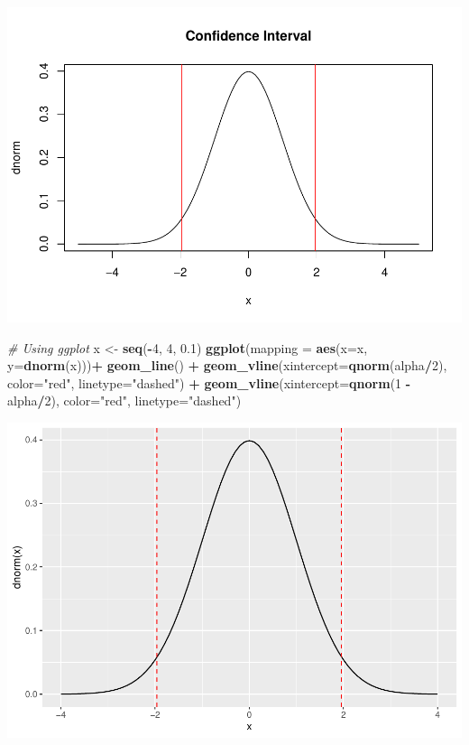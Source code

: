 \documentclass[
]{article}
\newenvironment{Shaded}{\begin{snugshade}}{\end{snugshade}}
\newcommand{\AttributeTok}[1]{\textcolor[rgb]{0.13,0.29,0.53}{#1}}
\newcommand{\CommentTok}[1]{\textcolor[rgb]{0.56,0.35,0.01}{\textit{#1}}}
\newcommand{\DecValTok}[1]{\textcolor[rgb]{0.00,0.00,0.81}{#1}}
\newcommand{\FloatTok}[1]{\textcolor[rgb]{0.00,0.00,0.81}{#1}}
\newcommand{\FunctionTok}[1]{\textcolor[rgb]{0.13,0.29,0.53}{\textbf{#1}}}
\newcommand{\NormalTok}[1]{#1}
\newcommand{\OtherTok}[1]{\textcolor[rgb]{0.56,0.35,0.01}{#1}}
\newcommand{\SpecialCharTok}[1]{\textcolor[rgb]{0.81,0.36,0.00}{\textbf{#1}}}
\newcommand{\StringTok}[1]{\textcolor[rgb]{0.31,0.60,0.02}{#1}}
\begin{document}
\includegraphics{Estimation-and-Confidence-intervals_files/figure-latex/unnamed-chunk-8-1.pdf}

\begin{Shaded}
\begin{Highlighting}[]
\CommentTok{\# Using ggplot}
\NormalTok{x }\OtherTok{\textless{}{-}} \FunctionTok{seq}\NormalTok{(}\SpecialCharTok{{-}}\DecValTok{4}\NormalTok{, }\DecValTok{4}\NormalTok{, }\FloatTok{0.1}\NormalTok{)}
\FunctionTok{ggplot}\NormalTok{(}\AttributeTok{mapping =} \FunctionTok{aes}\NormalTok{(}\AttributeTok{x=}\NormalTok{x, }\AttributeTok{y=}\FunctionTok{dnorm}\NormalTok{(x)))}\SpecialCharTok{+}
  \FunctionTok{geom\_line}\NormalTok{() }\SpecialCharTok{+} 
  \FunctionTok{geom\_vline}\NormalTok{(}\AttributeTok{xintercept=}\FunctionTok{qnorm}\NormalTok{(alpha}\SpecialCharTok{/}\DecValTok{2}\NormalTok{), }\AttributeTok{color=}\StringTok{"red"}\NormalTok{, }\AttributeTok{linetype=}\StringTok{"dashed"}\NormalTok{) }\SpecialCharTok{+} 
  \FunctionTok{geom\_vline}\NormalTok{(}\AttributeTok{xintercept=}\FunctionTok{qnorm}\NormalTok{(}\DecValTok{1} \SpecialCharTok{{-}}\NormalTok{ alpha}\SpecialCharTok{/}\DecValTok{2}\NormalTok{), }\AttributeTok{color=}\StringTok{"red"}\NormalTok{, }\AttributeTok{linetype=}\StringTok{"dashed"}\NormalTok{)}
\end{Highlighting}
\end{Shaded}

\includegraphics{Estimation-and-Confidence-intervals_files/figure-latex/unnamed-chunk-9-1.pdf}
\end{document}
